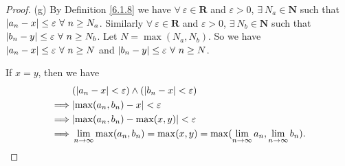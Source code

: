 \begin{proof}{(g)}
    By Definition \ref{6.1.8} we have \(\forall\ \varepsilon \in \mathbf{R}\) and \(\varepsilon > 0\), \(\exists\ N_a \in \mathbf{N}\) such that \(\abs*{a_n - x} \leq \varepsilon \ \forall\ n \geq N_a\).
    Similarly \(\forall\ \varepsilon \in \mathbf{R}\) and \(\varepsilon > 0\), \(\exists\ N_b \in \mathbf{N}\) such that \(\abs*{b_n - y} \leq \varepsilon \ \forall\ n \geq N_b\).
    Let \(N = \max(N_a, N_b)\).
    So we have \(\abs*{a_n - x} \leq \varepsilon \ \forall\ n \geq N\) and \(\abs*{b_n - y} \leq \varepsilon \ \forall\ n \geq N\).

    If \(x = y\), then we have
    \begin{align*}
                 & (\abs*{a_n - x} < \varepsilon) \land (\abs*{b_n - x} < \varepsilon)                                       \\
        \implies & \abs*{\max(a_n, b_n) - x} < \varepsilon                                                                   \\
        \implies & \abs*{\max(a_n, b_n) - \max(x, y)} < \varepsilon                                                          \\
        \implies & \lim_{n \to \infty} \max(a_n, b_n) = \max(x, y) = \max(\lim_{n \to \infty} a_n, \lim_{n \to \infty} b_n).
    \end{align*}


\end{proof}
